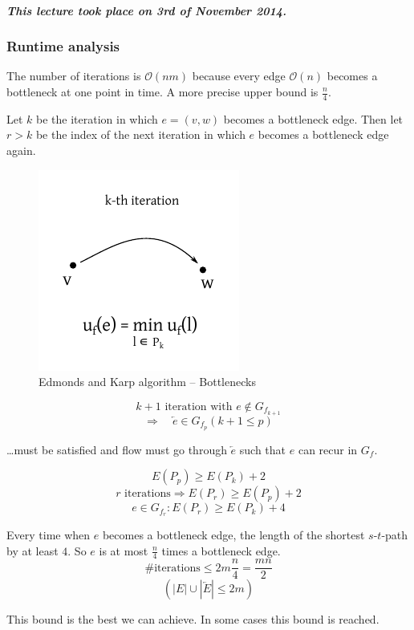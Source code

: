 \documentclass[a4paper]{article}
\theoremstyle{definition}
\newcommand{\dateref}[1]{\paragraph{\textit{This lecture took place on #1.}}}
\newcommand{\gath}[2]{$#1$-$#2$-path} %
\begin{document}
\dateref{3rd of November 2014}

\subsubsection{Runtime analysis}

The number of iterations is $\mathcal{O}(nm)$ because every edge $\mathcal{O}(n)$ becomes a bottleneck at one point in time. A more precise upper bound is $\frac{n}{4}$.

Let $k$ be the iteration in which $e = (v, w)$ becomes a bottleneck edge. Then let $r > k$ be the index of the next iteration in which $e$ becomes a bottleneck edge again.

\begin{figure}[ht]
 \begin{center}
  \includegraphics{img/ek_bottleneck.pdf}
  \caption{Edmonds and Karp algorithm -- Bottlenecks}
 \end{center}
\end{figure}

\[
  k+1 \text{ iteration with } e \notin G_{f_{k+1}}
\] \[
  \Rightarrow \quad \overleftarrow{e} \in G_{f_p}(k+1 \leq p)
\]
\begin{center}
  \dots must be satisfied and flow must go through $\overleftarrow{e}$ such that $e$ can recur in $G_f$.
\end{center}

\[ E(P_p) \geq E(P_k) + 2 \]
\[ r \text{ iterations} \Rightarrow E(P_r) \geq E(P_p) + 2 \]
\[ e \in G_{f_r}: E(P_r) \geq E(P_k) + 4 \]

Every time when $e$ becomes a bottleneck edge, the length of the shortest \gath st by at least $4$. So $e$ is at most $\frac n4$ times a bottleneck edge.
\[
  \#\text{iterations} \leq 2m \frac n4 = \frac{mn}2
\] \[
  (|E| \cup |\overleftarrow{E}| \leq 2m)
\]

This bound is the best we can achieve. In some cases this bound is reached.
\end{document}
